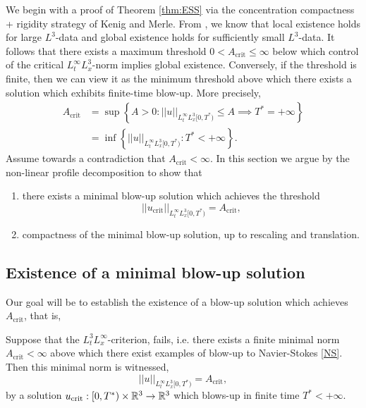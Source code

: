 We begin with a proof of Theorem \ref{thm:ESS} via the concentration compactness + rigidity strategy of Kenig and Merle. From \cite{Kato1984}, we know that local existence holds for large $L^3$-data and global existence holds for sufficiently small $L^3$-data. It follows that there exists a maximum threshold $0 < A_{\mathrm{crit}} \leq \infty$ below which control of the critical $L^\infty_t L^3_x$-norm implies global existence. Conversely, if the threshold is finite, then we can view it as the minimum threshold above which there exists a solution which exhibits finite-time blow-up. More precisely, 
	\begin{align*}
		A_{\mathrm{crit}} 
			&= \sup \left\{ A  > 0 :  ||u||_{L^\infty_t L^3_x [0, T^*)} \leq A \implies T^* = + \infty \right\}\\
			&= \inf\left\{||u||_{L^\infty_t L^3_x [0, T^*)}  : T^* < + \infty \right\}.
	\end{align*}
Assume towards a contradiction that $A_{\mathrm{crit}} < \infty$. In this section we argue by the non-linear profile decomposition to show that 
	\begin{enumerate}
		\item there exists a minimal blow-up solution which achieves the threshold
			\[
				||u_{\mathrm{crit}}||_{L^\infty_t L^3_x [0, T^*)} = A_{\mathrm{crit}},\]
		\item compactness of the minimal blow-up solution, up to rescaling and translation. 
	\end{enumerate}
	

\subsection{Existence of a minimal blow-up solution}

Our goal will be to establish the existence of a blow-up solution which achieves $A_{\mathrm{crit}}$, that is, 

\begin{proposition}
	Suppose that the $L^3_t L^\infty_x$-criterion, fails, i.e. there exists a finite minimal norm $A_{\mathrm{crit}} < \infty$ above which there exist examples of blow-up to Navier-Stokes \eqref{NS}. Then this minimal norm is witnessed,
		\[
			||u||_{L^\infty_t L^3_x[0, T^*)} = A_{\mathrm{crit}},
		\]
	by a solution $u_{\mathrm{crit}}: [0, T^*) \times \mathbb R^3 \to \mathbb R^3$ which blows-up in finite time $T^* < + \infty$.
\end{proposition}

